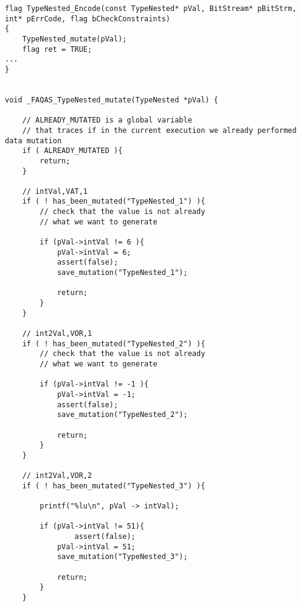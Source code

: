 \begin{lstlisting}[style=CStyle, caption=Example of data-driven mutation probe for ASN.1 that has been added to the encoding function., label=ASN_encodeReachable]
flag TypeNested_Encode(const TypeNested* pVal, BitStream* pBitStrm, int* pErrCode, flag bCheckConstraints)
{
    TypeNested_mutate(pVal);
    flag ret = TRUE;
...
}


void _FAQAS_TypeNested_mutate(TypeNested *pVal) {

	// ALREADY_MUTATED is a global variable 
	// that traces if in the current execution we already performed data mutation
	if ( ALREADY_MUTATED ){
		return;
	}
	
	// intVal,VAT,1
	if ( ! has_been_mutated("TypeNested_1") ){
		// check that the value is not already 
		// what we want to generate

		if (pVal->intVal != 6 ){
			pVal->intVal = 6;
			assert(false);
			save_mutation("TypeNested_1");

			return;
		}
	}
	
	// int2Val,VOR,1
	if ( ! has_been_mutated("TypeNested_2") ){
		// check that the value is not already 
		// what we want to generate

		if (pVal->intVal != -1 ){
			pVal->intVal = -1;
			assert(false);
			save_mutation("TypeNested_2");

			return;
		}
	}

	// int2Val,VOR,2
	if ( ! has_been_mutated("TypeNested_3") ){

        printf("%lu\n", pVal -> intVal);

        if (pVal->intVal != 51){
        	    assert(false);	
            pVal->intVal = 51;
            save_mutation("TypeNested_3");

            return;
        }
    }


\end{lstlisting}



%
%
%
